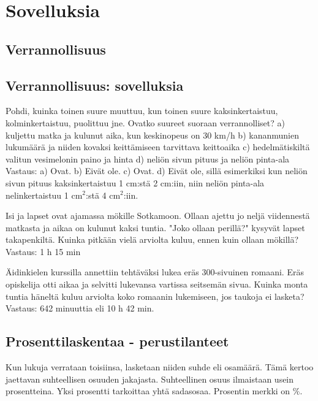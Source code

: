 %
\part{Sovelluksia}
%
%
\chapter{Verrannollisuus}
\chapter{Verrannollisuus: sovelluksia}

Pohdi, kuinka toinen suure muuttuu, kun toinen suure kaksinkertaistuu, kolminkertaistuu, puolittuu jne. Ovatko suureet suoraan verrannolliset?
a) kuljettu matka ja kulunut aika, kun keskinopeus on 30 km/h
b) kananmunien lukumäärä ja niiden kovaksi keittämiseen tarvittava keittoaika
c) hedelmätiskiltä valitun vesimelonin paino ja hinta
d) neliön sivun pituus ja neliön pinta-ala
Vastaus:
a) Ovat.
b) Eivät ole.
c) Ovat.
d) Eivät ole, sillä esimerkiksi kun neliön sivun pituus kaksinkertaistuu 1 cm:stä 2 cm:iin, niin neliön pinta-ala nelinkertaistuu 1 cm$^2$:stä 4 cm$^2$:iin.

Isi ja lapset ovat ajamassa mökille Sotkamoon. Ollaan ajettu jo neljä viidennestä matkasta ja aikaa on kulunut kaksi tuntia. "Joko ollaan perillä?" kysyvät lapset takapenkiltä. Kuinka pitkään vielä arviolta kuluu, ennen kuin ollaan mökillä?
Vastaus: 1 h 15 min

Äidinkielen kurssilla annettiin tehtäväksi lukea eräs 300-sivuinen romaani. Eräs opiskelija otti aikaa ja selvitti lukevansa vartissa seitsemän sivua. Kuinka monta tuntia häneltä kuluu arviolta koko romaanin lukemiseen, jos taukoja ei lasketa?
Vastaus: 642 minuuttia eli 10 h 42 min.

\chapter{Prosenttilaskentaa - perustilanteet}

Kun lukuja verrataan toisiinsa, lasketaan niiden suhde eli osamäärä. Tämä kertoo jaettavan suhteellisen osuuden jakajasta. Suhteellinen osuus ilmaistaan usein prosentteina. Yksi prosentti tarkoittaa yhtä sadasosaa. Prosentin merkki on $\%$.



